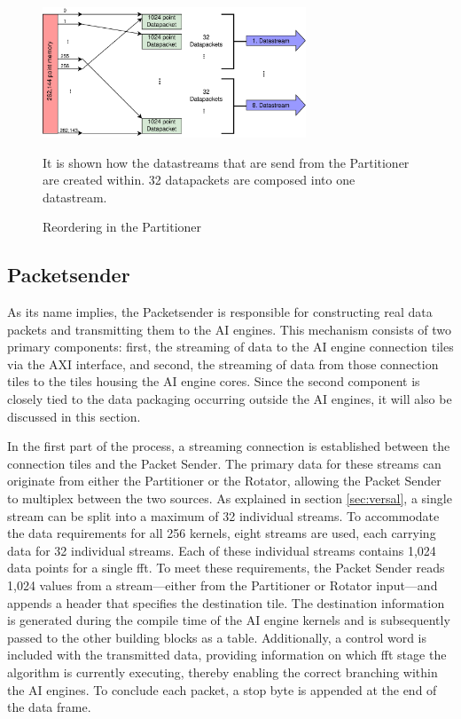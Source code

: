 \begin{figure}[h]
    \centering
    \includegraphics[width=0.7\textwidth]{images/input_reorder.png}
    \captionsetup{justification=centering}
    \caption{Reordering in the Partitioner}
            It is shown how the datastreams that are send from the Partitioner are created within. 32 datapackets are composed into one datastream.
    \label{fig:input_reorder}
\end{figure}

\subsection{Packetsender}
As its name implies, the Packetsender is responsible for constructing real data packets and transmitting them to the AI engines. This mechanism consists of two primary components: first, the streaming of data to the AI engine connection tiles via the AXI interface, and second, the streaming of data from those connection tiles to the tiles housing the AI engine cores. Since the second component is closely tied to the data packaging occurring outside the AI engines, it will also be discussed in this section.\par
In the first part of the process, a streaming connection is established between the connection tiles and the Packet Sender. The primary data for these streams can originate from either the Partitioner or the Rotator, allowing the Packet Sender to multiplex between the two sources. As explained in section \ref{sec:versal}, a single stream can be split into a maximum of 32 individual streams. To accommodate the data requirements for all 256 kernels, eight streams are used, each carrying data for 32 individual streams. Each of these individual streams contains 1,024 data points for a single \ac{fft}. To meet these requirements, the Packet Sender reads 1,024 values from a stream—either from the Partitioner or Rotator input—and appends a header that specifies the destination tile. The destination information is generated during the compile time of the AI engine kernels and is subsequently passed to the other building blocks as a table. Additionally, a control word is included with the transmitted data, providing information on which \ac{fft} stage the algorithm is currently executing, thereby enabling the correct branching within the AI engines. To conclude each packet, a stop byte is appended at the end of the data frame.

